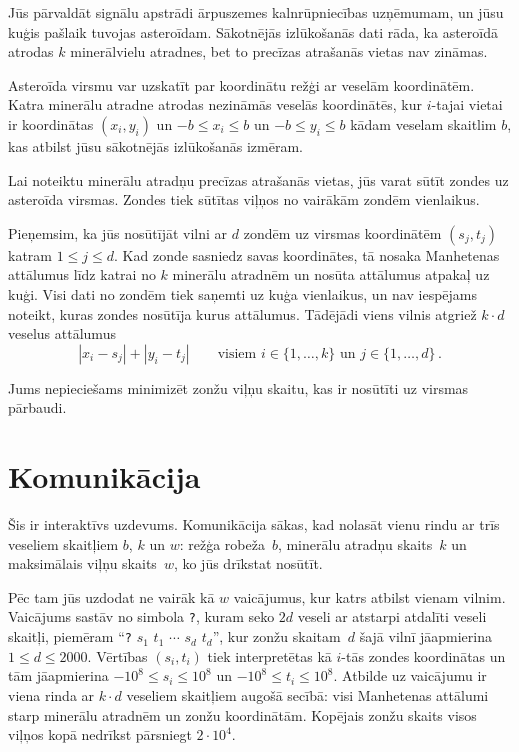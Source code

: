 

\noindent
Jūs pārvaldāt signālu apstrādi ārpuszemes kalnrūpniecības uzņēmumam, un jūsu kuģis pašlaik tuvojas asteroīdam. Sākotnējās izlūkošanās dati rāda, ka asteroīdā atrodas $k$ minerālvielu atradnes, bet to precīzas atrašanās vietas nav zināmas.

\medskip

Asteroīda virsmu var uzskatīt par koordinātu režģi ar veselām koordinātēm.
Katra minerālu atradne atrodas nezināmās veselās koordinātēs, kur $i$-tajai vietai ir koordinātas $(x_i, y_i)$ un
$-b \le x_i \le b$ un $-b\le y_i \le b$ %
kādam veselam skaitlim $b$, kas atbilst jūsu sākotnējās  izlūkošanās izmēram.

Lai noteiktu minerālu atradņu precīzas atrašanās vietas, jūs varat sūtīt zondes uz asteroīda virsmas.
Zondes tiek sūtītas viļņos no vairākām zondēm vienlaikus.

Pieņemsim, ka jūs nosūtījāt vilni ar $d$ zondēm uz virsmas koordinātēm $(s_j, t_j)$ katram $1\leq j\leq d$.
Kad zonde sasniedz savas koordinātes, tā nosaka Manhetenas attālumus līdz katrai no $k$ minerālu atradnēm un nosūta attālumus atpakaļ uz kuģi.
Visi dati no zondēm tiek saņemti uz kuģa vienlaikus, un nav iespējams noteikt, kuras zondes nosūtīja kurus attālumus.
Tādējādi viens vilnis atgriež $k\cdot d$ veselus attālumus
\[|x_i-s_j| + |y_i - t_j| \qquad\text{visiem } i \in \{1,\ldots,k\} \text{ un } j \in\{ 1,\ldots,d\}\,.\]

Jums nepieciešams minimizēt zonžu viļņu skaitu, kas ir nosūtīti uz virsmas pārbaudi.


\section*{Komunikācija}

Šis ir interaktīvs uzdevums.
Komunikācija sākas, kad nolasāt vienu rindu ar trīs veseliem skaitļiem $b$, $k$ un $w$:
režģa robeža~$b$,
minerālu atradņu skaits~$k$
un maksimālais viļņu skaits~$w$, ko jūs drīkstat nosūtīt.

Pēc tam jūs uzdodat ne vairāk kā $w$ vaicājumus, kur katrs atbilst vienam vilnim.
Vaicājums sastāv no simbola \texttt{?}, kuram seko $2d$ veseli ar atstarpi atdalīti veseli skaitļi, piemēram ``\texttt{?} $s_1$ $t_1$ $\cdots$ $s_d$ $t_d$'', kur zonžu skaitam~$d$ šajā vilnī jāapmierina
$1\leq d\leq 2000$. %
Vērtības $(s_i, t_i)$ tiek interpretētas kā $i$-tās zondes koordinātas un tām jāapmierina
$-10^8 \leq s_i \leq 10^8$ un $-10^8 \leq t_i \leq 10^8$. %
Atbilde uz vaicājumu ir viena rinda ar $k \cdot d$ veseliem skaitļiem augošā secībā: visi Manhetenas attālumi starp minerālu atradnēm un zonžu koordinātām.
Kopējais zonžu skaits visos viļņos kopā nedrīkst pārsniegt
$2\cdot 10^4$. %


